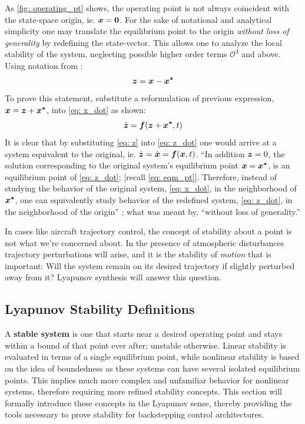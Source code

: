 \documentclass[12pt]{ucthesis}
\begin{document}
As \autoref{fig: operating_pt} shows, the operating point is not always coincident with the state-space origin, ie. $\boldsymbol{x}=\boldsymbol{0}$. For the sake of notational and analytical simplicity one may translate the equilibrium point to the origin \textit{without loss of generality} by redefining the state-vector. This allows one to analyze the local stability of the system, neglecting possible higher order terms $\mathcal{O}^3$ and above. Using notation from \citep[Pg. 23]{Krstic95}:
%
	\begin{equation}
		\boldsymbol{z}=\boldsymbol{x}-\boldsymbol{x^*}
		\label{eq: z}
	\end{equation}
%
To prove this statement, substitute a reformulation of previous expression, $\boldsymbol{x}=\boldsymbol{z}+\boldsymbol{x^*}$, into \autoref{eq: x_dot} as shown:
%
	\begin{equation}
		\dot{\boldsymbol{z}} = \boldsymbol{f}(\boldsymbol{z} + \boldsymbol{x^*},t)
		\label{eq: z_dot}
	\end{equation}
%
It is clear that by substituting \autoref{eq: z} into \autoref{eq: z_dot} one would arrive at a system equivalent to the original, ie. $\dot{\boldsymbol{z}} = \dot{\boldsymbol{x}} = \boldsymbol{f}(\boldsymbol{x},t)$. ``In addition $\boldsymbol{z}=0$, the solution corresponding to the original system's equilibrium point $\boldsymbol{x}=\boldsymbol{x^*}$, is an equilibrium point of \autoref{eq: z_dot}; [recall \autoref{eq: eqm_pt}]. Therefore, instead of studying the behavior of the original system, \autoref{eq: x_dot}, in the neighborhood of $\boldsymbol{x^*}$, one can equivalently study behavior of the redefined system, \autoref{eq: z_dot}, in the neighborhood of the origin''\cite{Slotine1991} ; what was meant by, ``without loss of generality.'' 

In cases like aircraft trajectory control, the concept of stability about a point is not what we're concerned about. In the presence of atmospheric disturbances trajectory perturbations will arise, and it is the stability of \textit{motion} that is important: Will the system remain on its desired trajectory if slightly perturbed away from it? Lyapunov synthesis will answer this question.

\subsection{Lyapunov Stability Definitions}
\label{subsec: lyapunov_stab_def}
%
A \textbf{stable system} is one that starts near a desired operating point and stays within a bound of that point ever after; unstable otherwise. Linear stability is evaluated in terms of a single equilibrium point, while nonlinear stability is based on the idea of boundedness as these systems can have several isolated equilibrium points. This implies much more complex and unfamiliar behavior for nonlinear systems, therefore requiring more refined stability concepts. This section will formally introduce these concepts in the Lyapunov sense, thereby providing the tools necessary to prove stability for backstepping control architectures.
\end{document}
